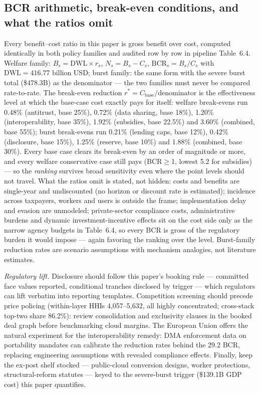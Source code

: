 \documentclass[11pt,a4paper]{article}
\begin{document}
\subsection{BCR arithmetic, break-even conditions, and what the ratios omit}\label{sec:policy-bcr}
Every benefit--cost ratio in this paper is gross benefit over cost, computed
identically in both policy families and audited row by row in pipeline
Table~6.4. Welfare family: $B_s = \mathrm{DWL}\times r_s$, $N_s =
B_s - C_s$, $\mathrm{BCR}_s = B_s / C_s$ with $\mathrm{DWL} =
416.77\text{ billion USD}$; burst family: the same form with the severe burst total
(\$478.3B) as the denominator --- the two families must never be compared
rate-to-rate. The break-even reduction $r^* = C_\mathrm{base} /
\mathrm{denominator}$ is the effectiveness level at which the base-case
cost exactly pays for itself: welfare break-evens run 0.48\% (antitrust,
base 25\%), 0.72\% (data sharing, base 18\%), 1.20\% (interoperability,
base 35\%), 1.92\% (subsidies, base 22.5\%) and 3.60\% (combined, base
55\%); burst break-evens run 0.21\% (lending caps, base 12\%), 0.42\%
(disclosure, base 15\%), 1.25\% (reserve, base 10\%) and 1.88\%
(combined, base 30\%). Every base case clears its break-even by an order of
magnitude or more, and every welfare conservative case still pays
(BCR$\ge$1, lowest 5.2 for subsidies) --- so the \emph{ranking} survives
broad sensitivity even where the point levels should not travel. What the
ratios omit is stated, not hidden: costs and benefits are single-year and
undiscounted (no horizon or discount rate is estimated); incidence across
taxpayers, workers and users is outside the frame; implementation delay and
evasion are unmodeled; private-sector compliance costs, administrative
burdens and dynamic investment-incentive effects sit on the cost side only as
the narrow agency budgets in Table~6.4, so every BCR is gross of the
regulatory burden it would impose --- again favoring the ranking over the
level. Burst-family reduction rates are scenario
assumptions with mechanism analogies, not literature estimates.

\emph{Regulatory lift.} Disclosure should follow this paper's booking rule
--- committed face values reported, conditional tranches disclosed by
trigger --- which regulators can lift verbatim into reporting templates.
Competition screening should precede price policing (within-layer HHIs
4,057--5,632, all highly concentrated; cross-stack top-two share 86.2\%):
review consolidation and exclusivity clauses in the booked deal graph before
benchmarking cloud margins. The European Union offers the natural experiment
for the interoperability remedy: DMA enforcement data on portability
mandates can calibrate the reduction rates behind the 29.2 BCR, replacing
engineering assumptions with revealed compliance effects. Finally, keep the
ex-post shelf stocked --- public-cloud conversion designs, worker
protections, structural-reform statutes --- keyed to the severe-burst
trigger (\$139.1B GDP cost) this paper quantifies.
\end{document}
